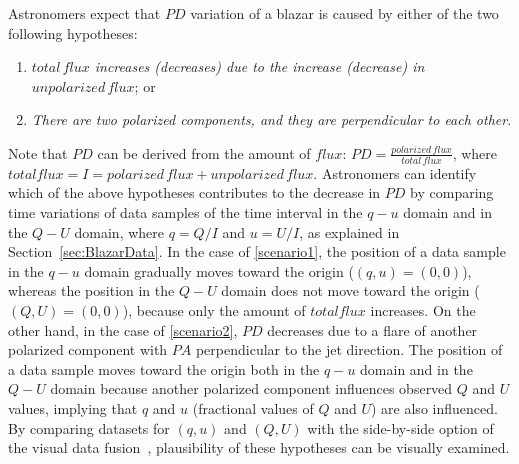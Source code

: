 Astronomers expect that $PD$ variation of a blazar is caused by either of the two following hypotheses:
\begin{enumerate}[nosep, label=\textsl{Hypothesis \arabic*}, align=parleft, leftmargin=*]
    \item \textsl{$total\,flux$ increases (decreases) due to the increase (decrease) in $unpolarized\,flux$}; or  \label{scenario1}
    \item \textsl{There are two polarized components, and they are perpendicular to each other}. \label{scenario2}
\end{enumerate}
Note that $PD$ can be derived from the amount of $flux$: $PD = \frac{polarized\,flux}{total\,flux}$,
where $total flux = I = polarized\,flux + unpolarized\,flux$.
Astronomers can identify which of the above hypotheses contributes to the decrease in $PD$
by comparing time variations of data samples of the time interval in the $q - u$ domain and in the $Q-U$ domain,
where $q = Q / I$ and $u = U / I$, as explained in Section~\ref{sec:BlazarData}.
In the case of \ref{scenario1}, the position of a data sample in the $q - u$ domain gradually moves toward the origin ($(q, u) = (0, 0)$),
whereas the position in the $Q-U$ domain does not move toward the origin ($(Q, U) = (0, 0)$),
because only the amount of $total flux$ increases.
On the other hand, in the case of \ref{scenario2}, 
$PD$ decreases due to a flare of another polarized component with $PA$ perpendicular to the jet direction.
The position of a data sample moves toward the origin both in the $q - u$ domain and in the $Q - U$ domain 
because another polarized component influences observed $Q$ and $U$ values, 
implying that $q$ and $u$ (fractional values of $Q$ and $U$) are also influenced.
By comparing datasets for $(q, u)$ and $(Q, U)$ with the side-by-side option of the visual data fusion~\cite{Fujishiro2018},
plausibility of these hypotheses can be visually examined.
